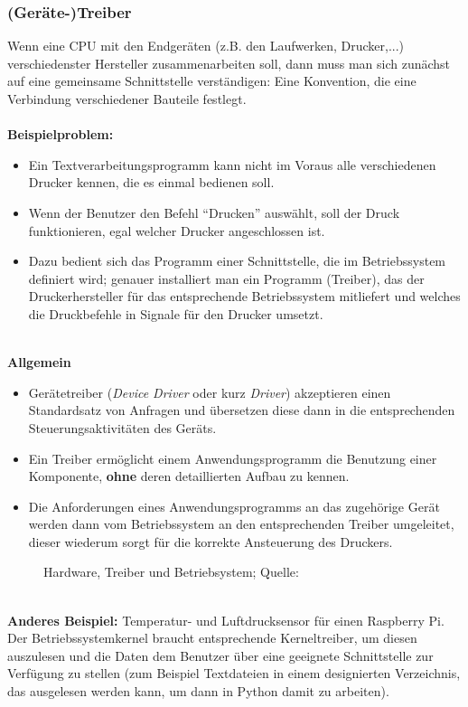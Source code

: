 \subsubsection{(Geräte-)Treiber}
Wenn eine CPU mit den Endgeräten (z.B. den Laufwerken, Drucker,...) verschiedenster Hersteller zusammenarbeiten soll, dann muss man sich zunächst auf eine gemeinsame Schnittstelle verständigen: Eine Konvention, die eine Verbindung verschiedener Bauteile festlegt.\\
~\\
\textbf{Beispielproblem:}
\begin{itemize}
	\item Ein Textverarbeitungsprogramm kann nicht im Voraus alle verschiedenen Drucker kennen, die
es  einmal bedienen soll. 
\item Wenn der Benutzer den Befehl ``Drucken'' auswählt, soll der Druck funktionieren, egal welcher Drucker angeschlossen ist. 
\item Dazu bedient sich das Programm einer Schnittstelle, die im Betriebssystem definiert wird; genauer installiert man ein Programm (Treiber), das der Druckerhersteller für das entsprechende Betriebssystem mitliefert und welches die Druckbefehle in Signale für den Drucker umsetzt.
\end{itemize}
~\\
\textbf{Allgemein}
\begin{itemize}
	\item  Gerätetreiber (\textit{Device Driver }oder kurz \textit{Driver}) akzeptieren einen Standardsatz von Anfragen und übersetzen diese dann in die entsprechenden Steuerungsaktivitäten des Geräts. 
\item Ein Treiber ermöglicht einem Anwendungsprogramm die Benutzung einer
Komponente, \textbf{ohne} deren detaillierten Aufbau zu kennen. 
\item Die Anforderungen eines
Anwendungsprogramms an das zugehörige Gerät werden dann vom Betriebssystem an den entsprechenden Treiber umgeleitet, dieser wiederum sorgt für die korrekte Ansteuerung des
Druckers.
\end{itemize}
%
\begin{figure}[h!]
	\centering
	\caption[Treiber]{Hardware, Treiber und Betriebsystem; Quelle: \cite[Abb. 1.27]{gumm1}}
	\label{fig:treiber}
\end{figure}

%
~\\
\textbf{Anderes Beispiel:} Temperatur- und Luftdrucksensor für einen Raspberry Pi. Der Betriebssystemkernel braucht entsprechende Kerneltreiber, um diesen auszulesen und die Daten dem Benutzer über eine geeignete Schnittstelle zur Verfügung zu stellen (zum Beispiel Textdateien in einem designierten Verzeichnis, das ausgelesen werden kann, um dann in Python damit zu arbeiten).
%
%

